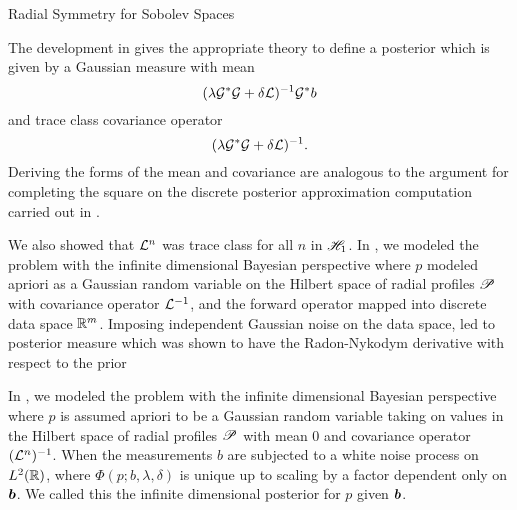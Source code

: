 \begin{chapter}{Radial Symmetry for Sobolev Spaces}
\begin{com}
The development in \citep{lehtinen1989linear} gives the appropriate theory to define a posterior which is given by a Gaussian measure with mean
\begin{equation}
  (\lambda \mathcal G^* \mathcal G + \delta \mathcal L)^{-1} \mathcal G^* b
\end{equation}
and trace class covariance operator
\begin{equation}
  (\lambda \mathcal G^*\mathcal G + \delta \mathcal L)^{-1}.
\end{equation}
Deriving the forms of the mean and covariance are analogous to the argument for completing the square on the discrete posterior approximation computation carried out in .
\end{com}

\begin{com}
We also showed that $\mathcal L^n$ was trace class for all $n$ in $\mathscr H_1$. %
In , we modeled the problem with the infinite dimensional Bayesian perspective where $p$ modeled apriori as a Gaussian random variable on the Hilbert space of radial profiles $\mathscr P$ with covariance operator $\mathcal L^{-1}$, and the forward operator mapped into discrete data space $\mathbb R^m$. 
Imposing independent Gaussian noise on the data space, led to posterior measure which was shown to have the Radon-Nykodym derivative with respect to the prior

In , we modeled the problem with the infinite dimensional Bayesian perspective where $p$ is assumed apriori to be a Gaussian random variable taking on values in the Hilbert space of radial profiles $\mathscr P$ with mean 0 and covariance operator $(\mathcal L^n)^{-1}$.
When the measurements $b$ are subjected to a white noise process on $L^2(\mathbb R)$, 
where $\Phi(p;b,\lambda,\delta)$ is unique up to scaling by a factor dependent only on $\mbox{\boldmath$b$}$.
We called this the infinite dimensional posterior for $p$ given $\mbox{\boldmath$b$}$.
\end{com}

\end{chapter}
